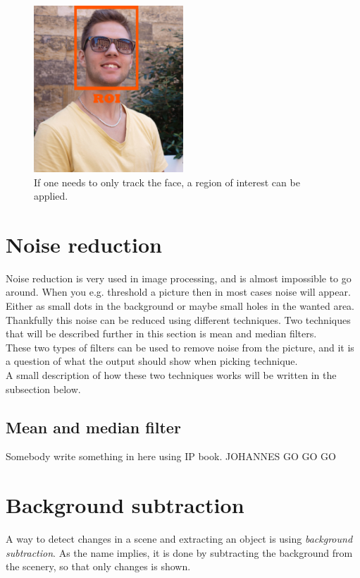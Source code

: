 {\begin{figure}[htbp] 
\centering 
\includegraphics[width=0.5\textwidth]{Pictures/Theory/RegionOfInterest.jpg} 
\caption{If one needs to only track the face, a region of interest can be applied.} 
\label{fig:Region of Interest} 
\end{figure} 

\section{Noise reduction}
Noise reduction is very used in image processing, and is almost impossible to go around. When you e.g. threshold a picture then in most cases noise will appear. Either as small dots in the background or maybe small holes in the wanted area. Thankfully this noise can be reduced using different techniques. Two techniques that will be described further in this section is mean and median filters.\\
These two types of filters can be used to remove noise from the picture, and it is a question of what the output should show when picking technique.\\
A small description of how these two techniques works will be written in the subsection below.

\subsection{Mean and median filter}
Somebody write something in here using IP book.
JOHANNES GO GO GO

\section{Background subtraction}
A way to detect changes in a scene and extracting an object is using \textit{background subtraction}. As the name implies, it is done by subtracting the background from the scenery, so that only changes is shown.

}
